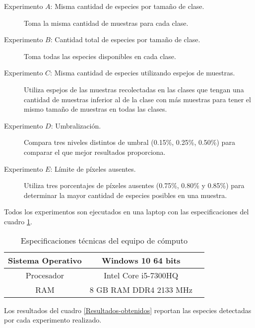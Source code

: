 \documentclass[review]{elsarticle}
\begin{document}
\begin{description}
\item[Experimento $A$: Misma cantidad de especies por tamaño de clase.]{Toma la misma cantidad de muestras para cada clase.}

\item[Experimento $B$:  Cantidad total de especies por tamaño de clase.]{Toma todas las especies disponibles en cada clase.}

\item[Experimento $C$: Misma cantidad de especies utilizando espejos de muestras.]{Utiliza espejos de las muestras recolectadas en las clases que tengan una cantidad de muestras inferior al de la clase con más muestras para tener el mismo tamaño de muestras en todas las clases.}

\item[Experimento $D$: Umbralización.]{Compara tres niveles distintos de umbral  (0.15\%, 0.25\%, 0.50\%) para comparar el que mejor resultados proporciona.} 

\item[Experimento $E$: Límite de píxeles ausentes.]{Utiliza tres porcentajes de píxeles ausentes (0.75\%, 0.80\% y 0.85\%) para determinar la mayor cantidad de especies posibles en una muestra.}
\end{description}
\clearpage

Todos los experimentos son ejecutados en una laptop con las especificaciones del cuadro \ref{tab:Especificaciones técnicas del PC}.

\begin{table}[H]
	{\centering
		\caption{Especificaciones técnicas del equipo de cómputo}
		\begin{tabular}{|c|c|c|}
			\hline
			Sistema Operativo & Windows 10 64 bits\\
			\hline
			Procesador & Intel Core i5-7300HQ\\
			\hline
			RAM & 8 GB RAM DDR4 2133 MHz\\
			\hline
		\end{tabular}

	\label{tab:Especificaciones técnicas del PC}
	}
\end{table}

Los resultados  del cuadro \ref{Resultados-obtenidos} reportan las especies detectadas por cada experimento realizado.
\end{document}
